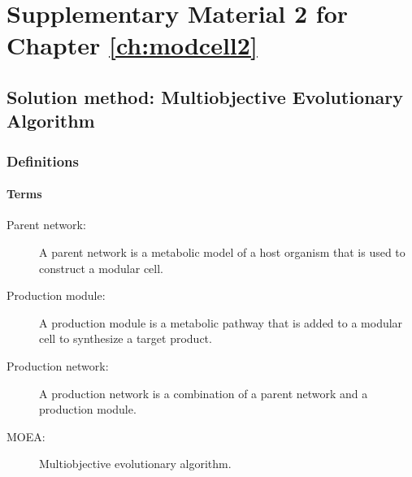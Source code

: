 \newcommand{\paragraphit}[1] {\paragraph{\textit{#1}}}

\renewcommand{\hbAppendixPrefix}{B}

\renewcommand{\thefigure}{\hbAppendixPrefix\arabic{figure}}
\setcounter{figure}{0}
\renewcommand{\thetable}{\hbAppendixPrefix\arabic{table}}
\setcounter{table}{0}
\renewcommand{\theequation}{\hbAppendixPrefix\arabic{equation}}
\setcounter{equation}{0}

\section{Supplementary Material 2 for Chapter \ref{ch:modcell2}} \label{apx:sm2-modcell2}


%
%
%
%

\subsection{Solution method: Multiobjective Evolutionary Algorithm}

\subsubsection{Definitions}
\paragraph{Terms}
\begin{description}
\item[Parent network:] A parent network is a metabolic model of a host organism that is used to construct a modular cell.
\item[Production module:] A production module is a metabolic pathway that is added to a modular cell to synthesize a target product.
\item[Production network:] A production network is a combination of a parent network and a production module.
\item[MOEA:] Multiobjective evolutionary algorithm.
\end{description}

